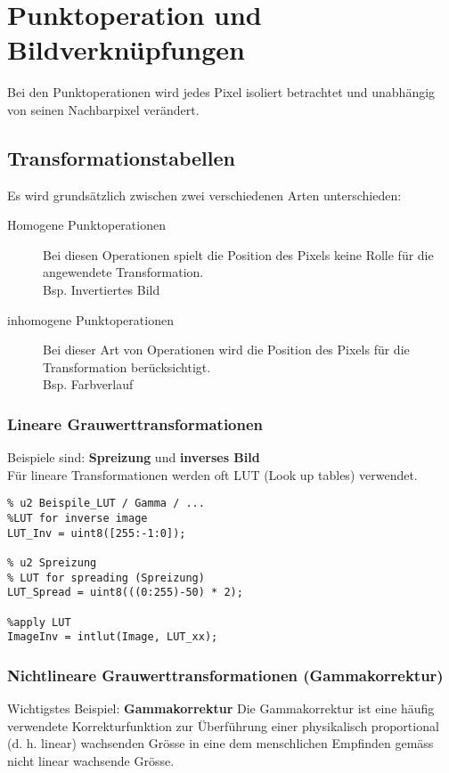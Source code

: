 
\section{Punktoperation und Bildverknüpfungen}
Bei den Punktoperationen wird jedes Pixel isoliert betrachtet und unabhängig von seinen Nachbarpixel verändert.
\subsection{Transformationstabellen}
Es wird grundsätzlich zwischen zwei verschiedenen Arten unterschieden:
\begin{description}
    \item[Homogene Punktoperationen] Bei diesen Operationen spielt die Position des Pixels keine Rolle für die angewendete Transformation.\\
    Bsp. Invertiertes Bild
    \item[inhomogene Punktoperationen] Bei dieser Art von Operationen wird die Position des Pixels für die Transformation berücksichtigt.\\
    Bsp. Farbverlauf
\end{description}

\subsubsection{Lineare Grauwerttransformationen}
Beispiele sind: \textbf{Spreizung} und \textbf{inverses Bild}\\
Für lineare Transformationen werden oft LUT (Look up tables) verwendet.
\begin{lstlisting}
% u2 Beispile_LUT / Gamma / ...
%LUT for inverse image
LUT_Inv = uint8([255:-1:0]);

% u2 Spreizung
% LUT for spreading (Spreizung) 
LUT_Spread = uint8(((0:255)-50) * 2);

%apply LUT
ImageInv = intlut(Image, LUT_xx);
\end{lstlisting}

\subsubsection{Nichtlineare Grauwerttransformationen (Gammakorrektur)}
Wichtigstes Beispiel: \textbf{Gammakorrektur}
Die Gammakorrektur ist eine häufig verwendete Korrekturfunktion zur Überführung einer physikalisch proportional (d. h. linear) wachsenden Grösse in eine dem menschlichen Empfinden gemäss nicht linear wachsende Grösse.

